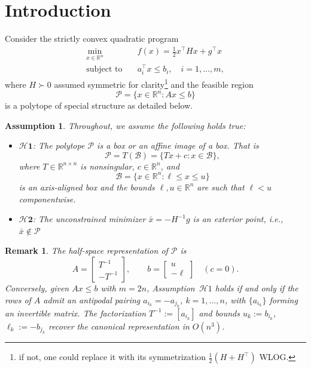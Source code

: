 \documentclass[pdflatex,sn-mathphys-num]{sn-jnl}%
\theoremstyle{thmstyleone}%
\theoremstyle{thmstyletwo}%
\newtheorem{remark}{Remark}%
\theoremstyle{thmstylethree}%
\newtheorem{assumption}[theorem]{Assumption}
\theoremstyle{thmstylethree}%
\newcommand{\Pset}{\mathcal{P}}
\begin{document}


\maketitle

\section{Introduction}\label{sec1}

Consider the strictly convex quadratic program
\begin{equation}\tag{P}\label{eq:qp}
\begin{aligned}
\min_{x \in \mathbb{R}^n} \quad & f(x) = \tfrac{1}{2}x^\top H x + g^\top x \\
\text{subject to} \quad & a_i^\top x \leq b_i, \quad i = 1,\ldots,m,
\end{aligned}
\end{equation}
where $H\succ0$ assumed symmetric for clarity\footnote{if not, one could replace it with its symmetrization $\frac{1}{2}(H + H^\top)$ WLOG.} and the feasible region
\[
\mathcal P = \{x\in\mathbb R^n : Ax\le b\}
\]
is a polytope of special structure as detailed below.

\begin{assumption}\label{assumption_1}
Throughout, we assume the following holds true:
\begin{itemize}[]
    \item $\mathbf{\mathcal{H}1}$: The polytope $\mathcal{P}$ is a box or an affine image of a box. That is
\[
\mathcal{P} = T(\mathcal{B}) = \{Tx + c : x \in \mathcal{B}\},
\]
where $T \in \mathbb{R}^{n\times n}$ is nonsingular, $c \in \mathbb{R}^n$, and
\[
\mathcal{B} = \{x \in \mathbb{R}^n : \ell \le x \le u\}
\]
is an axis-aligned box and the bounds $\ell,u \in \mathbb{R}^n$ are such that $\ell < u$ componentwise.
\item $\mathbf{\mathcal{H}2}$: The unconstrained minimizer $\bar{x} = -H^{-1}g$ is an exterior point, i.e., $\bar x \notin \Pset$
\end{itemize}
\end{assumption}

\begin{remark}\label{rem:halfspace-rep-boxes}
The half-space representation of $\mathcal P$ is
\[
A =
\begin{bmatrix}
T^{-1} \\ -T^{-1}
\end{bmatrix},
\qquad
b =
\begin{bmatrix}
u \\ -\ell
\end{bmatrix}
\quad (c=0).
\]
Conversely, given $Ax\le b$ with $m=2n$, Assumption~$\mathcal{H}1$ holds if and only if
the rows of $A$ admit an antipodal pairing $a_{i_k}=-a_{j_k}$, $k=1,\dots,n$,
with $\{a_{i_k}\}$ forming an invertible matrix.
The factorization $T^{-1}:=[a_{i_k}]$ and bounds $u_k:=b_{i_k}$, $\ell_k:=-b_{j_k}$
recover the canonical representation in $O(n^3)$.
\end{remark}
\end{document}
